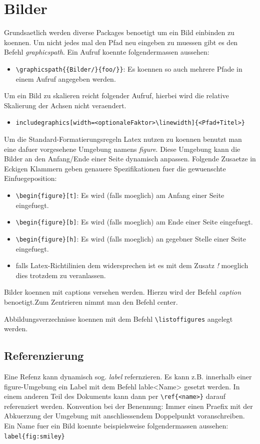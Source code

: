 \documentclass[11pt]{report}
\begin{document}
\section{Bilder}
Grundsaetlich werden diverse Packages benoetigt um ein Bild einbinden zu koennen. Um nicht jedes mal den Pfad neu eingeben zu muessen gibt es den Befehl \emph{graphicspath}. Ein Aufruf koennte folgendermassen aussehen: 
\begin{itemize}
	\item \verb|\graphicspath{{Bilder/}{foo/}}|: Es koennen so auch mehrere Pfade in einem Aufruf angegeben werden. 
\end{itemize}
Um ein Bild zu skalieren reicht folgender Aufruf, hierbei wird die relative Skalierung der Achsen nicht veraendert. 
\begin{itemize}
	\item \verb|includegraphics[width=<optionaleFaktor>\linewidth]{<Pfad+Titel>}|
\end{itemize}
Um die Standard-Formatierungsregeln Latex nutzen zu koennen benutzt man eine dafuer vorgesehene Umgebung namens \emph{figure}. Diese Umgebung kann die Bilder an den Anfang/Ende einer Seite dynamisch anpassen. Folgende Zusaetze in Eckigen Klammern geben genauere Spezifikationen fuer die gewuenschte Einfuegeposition: 
\begin{itemize}
	\item \verb|\begin{figure}[t]|: Es wird (falls moeglich) am Anfang einer Seite eingefuegt.
	\item \verb|\begin{figure}[b]|: Es wird (falls moeglich) am Ende einer Seite eingefuegt.
	\item \verb|\begin{figure}[h]|: Es wird (falls moeglich) an gegebner Stelle einer Seite eingefuegt.
	\item falls Latex-Richtilinien dem widersprechen ist es mit dem Zusatz \emph{!} moeglich dies trotzdem zu 		veranlassen.
\end{itemize}
Bilder koennen mit captions versehen werden. Hierzu wird der Befehl \emph{caption} benoetigt.Zum Zentrieren nimmt man den Befehl center.

Abbildungsverzechnisse koennen mit dem Befehl \verb|\listoffigures| angelegt werden. 

\subsection{Referenzierung}
Eine Refenz kann dynamisch sog. \emph{label} refernzieren. Es kann z.B. innerhalb einer figure-Umgebung ein Label mit dem Befehl lable{<Name>} gesetzt werden. In einem anderen Teil des Dokuments kann dann per \verb|\ref{<name>}| darauf referenziert werden. Konvention bei der Benennung: Immer einen Praefix mit der Abkuerzung der Umgebung mit anschliessendem Doppelpunkt voranschreiben. Ein Name fuer ein Bild koennte beispielsweise folgendermassen aussehen: \verb|label{fig:smiley}|
\end{document}
